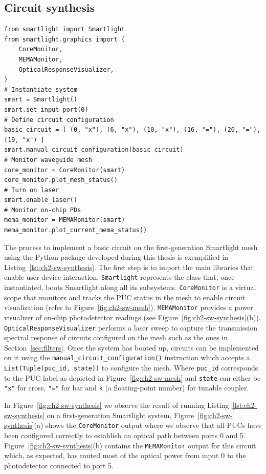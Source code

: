 \subsection{Circuit synthesis}\label{sub:circuit_synthesis} %

\begin{lstlisting}[caption={Manual synthesis of a basic circuit using the first-generation Smartlight API}, label=lst:ch2-sw-synthesis]
from smartlight import Smartlight
from smartlight.graphics import (
    CoreMonitor,
    MEMAMonitor,
    OpticalResponseVisualizer,
)
# Instantiate system
smart = Smartlight()
smart.set_input_port(0)
# Define circuit configuration
basic_circuit = [ (0, "x"), (6, "x"), (10, "x"), (16, "="), (20, "="), (19, "x") ]
smart.manual_circuit_configuration(basic_circuit)
# Monitor waveguide mesh
core_monitor = CoreMonitor(smart)
core_monitor.plot_mesh_status()
# Turn on laser
smart.enable_laser()
# Monitor on-chip PDs
mema_monitor = MEMAMonitor(smart)
mema_monitor.plot_current_mema_status()
\end{lstlisting}

The process to implement a basic circuit on the first-generation Smartlight mesh using the Python package developed during this thesis is exemplified in Listing~\ref{lst:ch2-sw-synthesis}.
The first step is to import the main libraries that enable user-device interaction.
\lstinline|Smartlight| represents the class that, once instantiated, boots Smartlight along all its subsystems.
\lstinline|CoreMonitor| is a virtual scope that monitors and tracks the PUC status in the mesh to enable circuit visualization (refer to Figure~\ref{fig:ch2-sw-mesh}).
\lstinline|MEMAMonitor| provides a power visualizer of on-chip photodetector readings (see Figure~\ref{fig:ch2-sw-synthesis}(b)).
\lstinline|OpticalResponseVisualizer| performs a laser sweep to capture the transmission spectral response of circuits configured on the mesh such as the ones in Section~\ref{sec:filters}.
Once the system has booted up, circuits can be implemented on it using the \lstinline|manual_circuit_configuration()| instruction which accepts a \lstinline|List(Tuple(puc_id, state))| to configure the mesh.
Where \lstinline|puc_id| corresponds to the PUC label as depicted in Figure~\ref{fig:ch2-sw-mesh} and \lstinline|state| can either be \lstinline|"x"| for cross, \lstinline|"="| for bar and \lstinline|k| (a floating-point number) for tunable coupler.

In Figure~\ref{fig:ch2-sw-synthesis} we observe the result of running Listing~\ref{lst:ch2-sw-synthesis} on a first-generation Smartlight system.
Figure~\ref{fig:ch2-sw-synthesis}(a) shows the \lstinline|CoreMonitor| output where we observe that all PUCs have been configured correctly to establish an optical path between ports 0 and 5.
Figure~\ref{fig:ch2-sw-synthesis}(b) contains the \lstinline|MEMAMonitor| output for this circuit which, as expected, has routed most of the optical power from input 0 to the photodetector connected to port 5.

